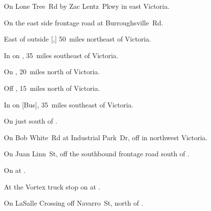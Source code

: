 
\begin{LocationList}

On Lone Tree~Rd by  Zac Lentz~Pkwy in east Victoria.

On the east side  frontage road at Burroughsville~Rd.

East of  outside [,] 50~miles northeast of Victoria.

In  on , 35~miles southeast of Victoria.

On , 20~miles north of Victoria.

Off , 15~miles north of Victoria.

In  on [Bus], 35~miles southeast of Victoria.

On  just south of .

On Bob White~Rd at Industrial Park~Dr, off  in northwest Victoria.

\Location{\TruckService \Service}
On Juan Linn~St, off the southbound  frontage road south of .

\Location{\TruckStop \Gas \Rest \Weigh}
On  at .

At the Vortex truck stop on  at .

On LaSalle Crossing off  Navarro~St, north of .

\end{LocationList}
